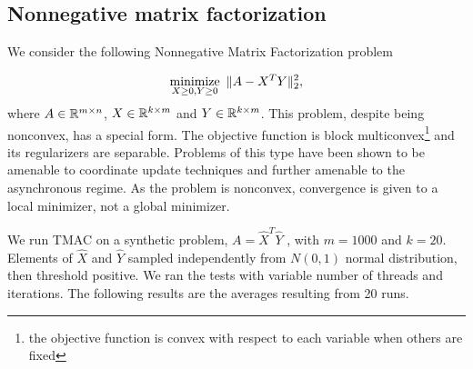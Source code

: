 \subsection{Nonnegative matrix factorization}

We consider the following Nonnegative Matrix Factorization problem

\begin{equation*}
	\operatorname*{minimize}_{X \geq 0,Y \geq 0} ~\|A-X^T Y\|_2^2,
\end{equation*}
where $A \in \mathbb{R}^{m\times n}$, $X \in \mathbb{R}^{k \times m}$ and $Y \in \mathbb{R}^{k \times m}$.
This problem, despite being nonconvex, has a special form.
The objective function is block multiconvex\footnote{the objective function is convex with respect to each variable when others are fixed} and its regularizers are separable. Problems of this type have been shown \citep{XuYin2013_block,XuYin2014_GloballyConvergent,BolteSabachTeboulle2014_proximal} to be amenable to coordinate update techniques and further amenable \citep{2016APALM} to the asynchronous regime.
As the problem is nonconvex, convergence is given to a local minimizer, not a global minimizer.

We run TMAC on a synthetic problem, $A=\hat X^T \hat Y$ ,  with $m=1000$ and $k=20$.
Elements of $\hat X$ and $\hat Y$ sampled independently from $N(0, 1)$ normal distribution, then threshold positive.
We ran the tests with variable number of threads and iterations.
The following results are the averages resulting from 20 runs.


